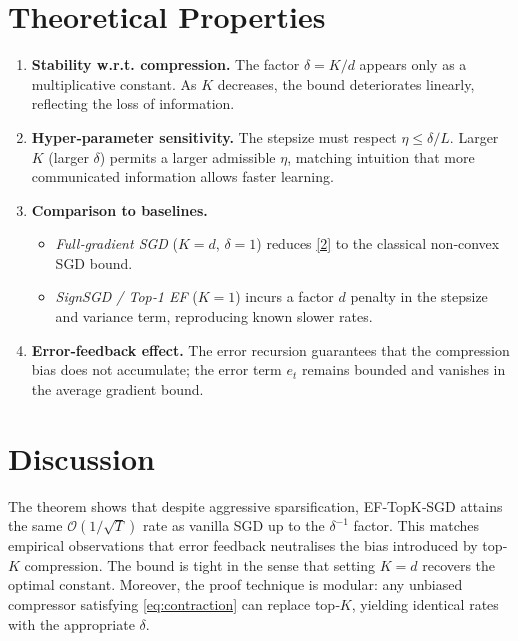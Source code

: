 \documentclass{article}
\begin{document}
\section*{Theoretical Properties}
\begin{enumerate}[label=\arabic*.]
\item \textbf{Stability w.r.t. compression.} The factor $\delta=K/d$ appears only as a multiplicative constant. As $K$ decreases, the bound deteriorates linearly, reflecting the loss of information.
\item \textbf{Hyper‑parameter sensitivity.} The stepsize must respect $\eta\le \delta/L$. Larger $K$ (larger $\delta$) permits a larger admissible $\eta$, matching intuition that more communicated information allows faster learning.
\item \textbf{Comparison to baselines.}
\begin{itemize}
\item \emph{Full‑gradient SGD} ($K=d$, $\delta=1$) reduces \eqref{2} to the classical non‑convex SGD bound.
\item \emph{SignSGD / Top‑1 EF} ($K=1$) incurs a factor $d$ penalty in the stepsize and variance term, reproducing known slower rates.
\end{itemize}
\item \textbf{Error‑feedback effect.} The error recursion guarantees that the compression bias does not accumulate; the error term $e_t$ remains bounded and vanishes in the average gradient bound.
\end{enumerate}

\section*{Discussion}
The theorem shows that despite aggressive sparsification, EF‑TopK‑SGD attains the same $\mathcal{O}(1/\sqrt{T})$ rate as vanilla SGD up to the $\delta^{-1}$ factor. This matches empirical observations that error feedback neutralises the bias introduced by top‑$K$ compression. The bound is tight in the sense that setting $K=d$ recovers the optimal constant. Moreover, the proof technique is modular: any unbiased compressor satisfying \eqref{eq:contraction} can replace top‑$K$, yielding identical rates with the appropriate $\delta$.

\newpage
\end{document}
